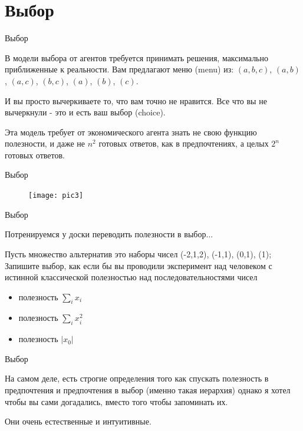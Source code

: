 \documentclass{beamer}
\begin{document}
\section{Выбор}

\begin{frame}{Выбор}

В модели выбора от агентов требуется принимать решения, максимально приближенные к реальности. Вам предлагают меню (\alert{menu}) из: $(a,b,c)$, $(a,b)$, $(a,c)$, $(b,c)$, $(a)$, $(b)$, $(c)$.

И вы просто вычеркиваете то, что вам точно не нравится. Все что вы не вычеркнули - это и есть ваш выбор (\alert{choice}). 

Эта модель требует от экономического агента знать не свою функцию полезности, и даже не $n^2$ готовых ответов, как в предпочтениях, а целых $2^n$ готовых ответов.

\end{frame}

\begin{frame}{Выбор}

\begin{figure}[hbt]
\centering
\texttt{[image: pic3]}
\end{figure}

\end{frame}

\begin{frame}{Выбор}

Потренируемся у доски переводить полезности в выбор...

Пусть множество альтернатив это наборы чисел (-2,1,2), (-1,1), (0,1), (1); Запишите выбор, как если бы вы проводили эксперимент над человеком с истинной классической полезностью над последовательностями чисел

\begin{itemize}
\item полезность $\sum_i x_i$
\item полезность $\sum_i x_i^2$
\item полезность $|x_0|$
\end{itemize}

\end{frame}

\begin{frame}{Выбор}

На самом деле, есть строгие определения того как спускать полезность в предпочтения и предпочтения в выбор (именно такая иерархия) однако я хотел чтобы вы сами догадались, вместо того чтобы запоминать их.

Они очень естественные и интуитивные.
\end{frame}
\end{document}
